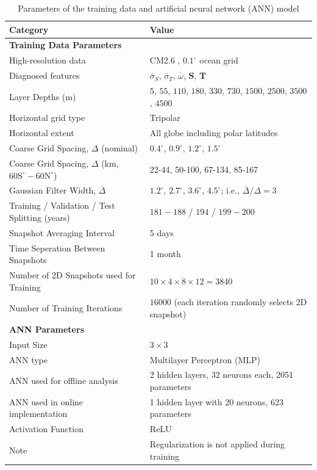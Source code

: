 \documentclass[draft,grl]{agutexSI2019}
\begin{document}
\begin{table}[]
\centering
\caption{Parameters of the training data and artificial neural network (ANN) model}
\label{tab:parameters}
\begin{tabular}{ll}
\toprule
\textbf{Category} & \textbf{Value} \\
\midrule
\textbf{Training Data Parameters} & \\
High-resolution data & CM2.6 \cite{griffies2015impacts}, $0.1^\circ$ ocean grid\\ 
Diagnosed features & $\overline{\sigma}_S$, $\overline{\sigma}_T$, $\overline{\omega}$, $\mathbf{S}$, $\mathbf{T}$  \\
Layer Depths (m) & $5$, $55$, $110$, $180$, $330$, $730$, $1500$, $2500$, $3500$, $4500$ \\
Horizontal grid type & Tripolar \\
Horizontal extent & All globe including polar latitudes \\
Coarse Grid Spacing, $\Delta$ (nominal) & $0.4^\circ$, $0.9^\circ$, $1.2^\circ$, $1.5^\circ$ \\
Coarse Grid Spacing, $\Delta$ (km, $60\mathrm{S}^\circ-60\mathrm{N}^\circ$) & 22-44, 50-100, 67-134, 85-167 \\
Gaussian Filter Width, $\overline{\Delta}$ & $1.2^\circ$, $2.7^\circ$, $3.6^\circ$, $4.5^\circ$; i.e., $\overline{\Delta}/\Delta=3$ \\
Training / Validation / Test Splitting (years) & $181-188$ / $194$ / $199-200$ \\
Snapshot Averaging Interval & 5 days \\
Time Seperation Between Snapshots & 1 month \\
Number of 2D Snapshots used for Training & $10 \times 4 \times 8 \times 12 = 3840$ \\
Number of Training Iterations & $16000$ (each iteration randomly selects 2D snapshot) \\
\midrule
\textbf{ANN Parameters} & \\
Input Size & $3 \times 3$ \\
ANN type & Multilayer Perceptron (MLP) \\
ANN used for offline analysis & 2 hidden layers, 32 neurons each, 2051 parameters \\
ANN used in online implementation & 1 hidden layer with 20 neurons, 623 parameters \\
Activation Function & ReLU \\
Note & Regularization is not applied during training \\
\bottomrule
\end{tabular}
\end{table}
\end{document}
